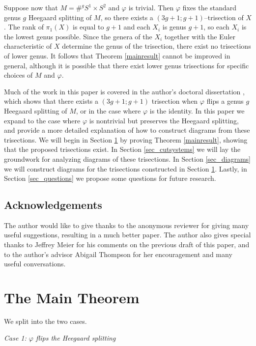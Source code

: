 \documentclass[12pt]{amsart}
\theoremstyle{definition}
\theoremstyle{remark}
\begin{document}
Suppose now that $M = \#^g S^1 \times S^2$ and $\varphi$ is trivial.  Then $\varphi$ fixes the standard genus $g$ Heegaard splitting of $M$, so there exists a $(3g+1;g+1)$--trisection of $X$.  The rank of $\pi_1(X)$ is equal to $g+1$ and each $X_i$ is genus $g+1$,  so each $X_i$ is the lowest genus possible.  Since the genera of the $X_i$ together with the Euler characteristic of $X$ determine the genus of the trisection, there exist no trisections of lower genus.  It follows that Theorem \ref{mainresult} cannot be improved in general, although it is possible that there exist lower genus trisections for specific choices of $M$ and $\varphi$.

Much of the work in this paper is covered in the author's doctoral dissertation \cite{koenig1}, which shows that there exists a $(3g+1;g+1)$ trisection when $\varphi$ flips a genus $g$ Heegaard splitting of $M$, or in the case where $\varphi$ is the identity.  In this paper we expand to the case where $\varphi$ is nontrivial but preserves the Heegaard splitting, and provide a more detailed explanation of how to construct diagrams from these trisections.  We will begin in Section \ref{sec_mainthm} by proving Theorem \ref{mainresult}, showing that the proposed trisections exist.  In Section \ref{sec_cutsystems} we will lay the groundwork for analyzing diagrams of these trisections.  In Section \ref{sec_diagrams} we will construct diagrams for the trisections constructed in Section \ref{sec_mainthm}.  Lastly, in Section \ref{sec_questions} we propose some questions for future research.

\subsection*{Acknowledgements} The author would like to give thanks to the anonymous reviewer for giving many useful suggestions, resulting in a much better paper.  The author also gives special thanks to  Jeffrey Meier for his comments on the previous draft of this paper, and to the author's advisor Abigail Thompson for her encouragement and many useful conversations.


\section{The Main Theorem}
\label{sec_mainthm}

We split into the two cases.

\smallskip
\noindent\textit{Case 1: $\varphi$ flips the Heegaard splitting}\ \ 
\end{document}
